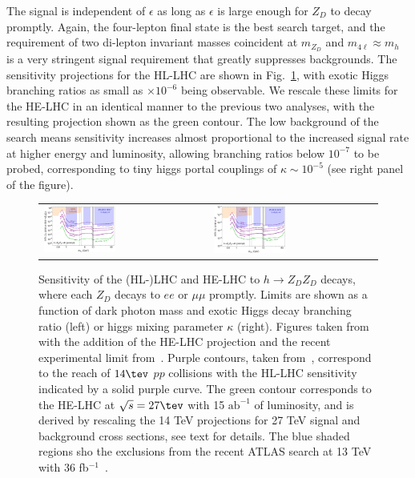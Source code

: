 The signal is independent of $\epsilon$ as long as $\epsilon$ is large enough for $Z_D$ to decay promptly. 
%
Again, the four-lepton final state is the best search target, and the requirement of two di-lepton invariant masses coincident at $m_{Z_D}$ and $m_{4 \ell} \approx m_h$ is a very stringent signal requirement that greatly suppresses backgrounds. 
%
The sensitivity projections for the HL-LHC are shown in Fig.~\ref{f.darkphotonZDZDprompt}, with exotic Higgs branching ratios as small as $\times 10^{-6}$ being observable. 
%
We rescale these limits for the HE-LHC in an identical manner to the previous two analyses, with the resulting projection shown as the green contour. The low background of the search means sensitivity increases almost proportional to the increased signal rate at higher energy and luminosity, allowing branching ratios below $10^{-7}$ to be probed, corresponding to tiny higgs portal couplings of $\kappa \sim 10^{-5}$ (see right panel of the figure). 


\begin{figure}
\begin{tabular}{m{} m{}}
\includegraphics[width=0.45\textwidth]{section9/plots/FORPAPER_HiggsMixingLimitsBrHZdZd_14_27_TeV}
&
\includegraphics[width=0.45\textwidth]{section9/plots/FORPAPER_HiggsMixingLimitskappaprime_14_27_TeV}
\end{tabular}
\caption{
Sensitivity of the (HL-)LHC and HE-LHC to  $h \to Z_D Z_D$ decays, where each $Z_D$ decays to $ee$ or $\mu \mu$ promptly. Limits are shown as a function of dark photon mass and exotic Higgs decay branching ratio (left) or higgs mixing parameter $\kappa$ (right). 
%
Figures taken from~\cite{Curtin:2014cca} with the addition of the HE-LHC projection and the recent experimental limit from~\cite{Aaboud:2018fvk}.
%
 Purple contours, taken from~\cite{Curtin:2014cca}, correspond to the reach of $14 \tev$ $pp$ collisions with the HL-LHC sensitivity indicated by a solid purple curve. The green contour corresponds to the HE-LHC at $\sqrt{s} = 27 \tev$ with 15 $\mathrm{ab}^{-1}$ of luminosity, and is derived by rescaling the 14 TeV projections for 27 TeV signal and background cross sections, see text for details. The blue shaded regions sho the exclusions from the recent ATLAS search at 13 TeV with 36 fb$^{-1}$~\cite{Aaboud:2018fvk}.
}
\label{f.darkphotonZDZDprompt}
\end{figure}


